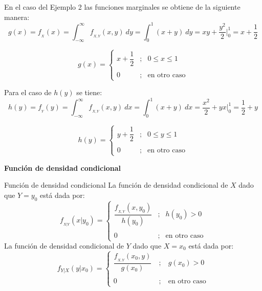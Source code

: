\documentclass[base=hide,12pt]{elegantbook}
\begin{document}
En el caso del Ejemplo 2 las funciones marginales se obtiene de la siguiente manera:
$$g(x)=f_{_{X}}(x)=\int_{-\infty}^{\infty}f_{_{X,Y}}(x,y)\:dy = \int_{0}^{1} (x+y) \:dy = xy+\dfrac{y^{2}}{2}\Bigg|_{0}^{1}= x+\dfrac{1}{2} $$


\begin{equation*}
	g(x)=\left\lbrace
	\begin{array}{ccl}
		x+\dfrac{1}{2} &;& 0 \leq x \leq 1 \\
		&&\\
		0 &;&\mbox{en otro caso}
	\end{array}
	\right.
\end{equation*}

Para el caso de $h(y)$ se tiene:
$$h(y)=f_{_{Y}}(y)=\int_{-\infty}^{\infty}f_{_{X,Y}}(x,y)\:dx = \int_{0}^{1} (x+y) \:dx = \dfrac{x^{2}}{2}+yx \Bigg|_{0}^{1}= \dfrac{1}{2}+y $$

\begin{equation*}
	h(y)=\left\lbrace
	\begin{array}{ccl}
		y+\dfrac{1}{2} &;& 0 \leq y \leq 1 \\
		&&\\
		0 &;&\mbox{en otro caso}
	\end{array}
	\right.
\end{equation*}
%

\vspace{1cm}
\textcolor{col4}{\bf \large Función de densidad condicional}\\%


\begin{Box4}{Función de densidad condicional}
La función de densidad condicional de $X$ dado que $Y=y_0$ está dada por:
\begin{equation*}
	f_{_{X|Y}}(x|y_{0})=\left\lbrace
	\begin{array}{ccl}
		\dfrac{f_{_{X,Y}}(x,y_0)}{h(y_0)}&;& h(y_0) > 0\\
		&&\\
		0 &;&\mbox{en otro caso}
	\end{array}
	\right.
\end{equation*}
La función de densidad condicional de $Y$ dado que $X=x_0$ está dada por:
\begin{equation*}
	f_{Y|X}(y|x_{0})=\left\lbrace
	\begin{array}{ccl}
		\dfrac{f_{_{X,Y}}(x_0,y)}{g(x_0)}\:&;&\:g(x_0)>0\\
		&&\\
		0\:&;&\:\mbox{en otro caso}
	\end{array}
	\right.
\end{equation*}
\end{Box4}
\end{document}
